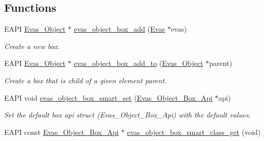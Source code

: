 \subsection*{Functions}
\begin{DoxyCompactItemize}
\item 
EAPI \hyperlink{group__Evas__Object__Group_ga9e19e6dd1f517a0ba437c0114d3e7c97}{Evas\_\-Object} $\ast$ \hyperlink{group__Evas__Object__Box_ga84e87534e6a45a725d59c0366f4e6544}{evas\_\-object\_\-box\_\-add} (\hyperlink{group__Evas__Canvas_ga5ff87cc4ce6bc43e3b640a6d37f73043}{Evas} $\ast$evas)
\begin{DoxyCompactList}\small\item\em Create a new box. \item\end{DoxyCompactList}\item 
EAPI \hyperlink{group__Evas__Object__Group_ga9e19e6dd1f517a0ba437c0114d3e7c97}{Evas\_\-Object} $\ast$ \hyperlink{group__Evas__Object__Box_gaf332313478211a06a09038755cf139bf}{evas\_\-object\_\-box\_\-add\_\-to} (\hyperlink{group__Evas__Object__Group_ga9e19e6dd1f517a0ba437c0114d3e7c97}{Evas\_\-Object} $\ast$parent)
\begin{DoxyCompactList}\small\item\em Create a box that is child of a given element {\itshape parent\/}. \item\end{DoxyCompactList}\item 
EAPI void \hyperlink{group__Evas__Object__Box_ga19c407e45de527d9400823fb1c85d0fe}{evas\_\-object\_\-box\_\-smart\_\-set} (\hyperlink{struct__Evas__Object__Box__Api}{Evas\_\-Object\_\-Box\_\-Api} $\ast$api)
\begin{DoxyCompactList}\small\item\em Set the default box {\itshape api\/} struct (Evas\_\-Object\_\-Box\_\-Api) with the default values. \item\end{DoxyCompactList}\item 
EAPI const \hyperlink{struct__Evas__Object__Box__Api}{Evas\_\-Object\_\-Box\_\-Api} $\ast$ \hyperlink{group__Evas__Object__Box_ga58da2c7328e5c8a01a8817f934d083ff}{evas\_\-object\_\-box\_\-smart\_\-class\_\-get} (void)\label{group__Evas__Object__Box_ga58da2c7328e5c8a01a8817f934d083ff}


\end{DoxyCompactItemize}

